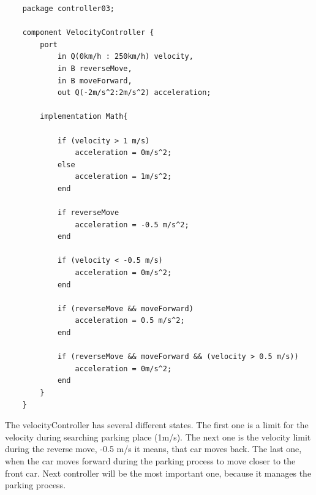 \begin{lstlisting}
    package controller03;

    component VelocityController {
        port                                    
            in Q(0km/h : 250km/h) velocity,
            in B reverseMove,
            in B moveForward,
            out Q(-2m/s^2:2m/s^2) acceleration; 
    
        implementation Math{                    
    
            if (velocity > 1 m/s)
                acceleration = 0m/s^2;
            else
                acceleration = 1m/s^2;
            end
            
            if reverseMove
                acceleration = -0.5 m/s^2;
            end
            
            if (velocity < -0.5 m/s)
                acceleration = 0m/s^2;
            end
            
            if (reverseMove && moveForward)
                acceleration = 0.5 m/s^2;
            end
            
            if (reverseMove && moveForward && (velocity > 0.5 m/s))
                acceleration = 0m/s^2;
            end
        }
    }
\end{lstlisting}
\bigskip
The velocityController has several different states. The first one is a limit for the velocity during searching parking place (1m/s). The next one is the velocity limit during the reverse move, -0.5 m/s it means, that car moves back. The last one, when the car moves forward during the parking process to move closer to the front car. Next controller will be the most important one, because it manages the parking process.
\bigskip
